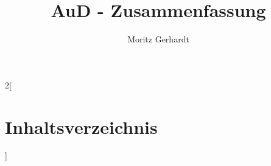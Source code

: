 \documentclass[
ngerman,
color=3b,
boxarc,
main,
tikz,
border=3mm
]{article}
\title{AuD - Zusammenfassung} %
\author{Moritz Gerhardt } %
\date{} %
\begin{document}
\maketitle
\thispagestyle{fancy}

\begin{multicols*}{2}[
\section{Inhaltsverzeichnis}
]
\tableofcontents
\end{multicols*}
\newpage


\newpage

\newpage 

\newpage

\newpage

\newpage

\newpage

\newpage

\newpage

\end{document}
